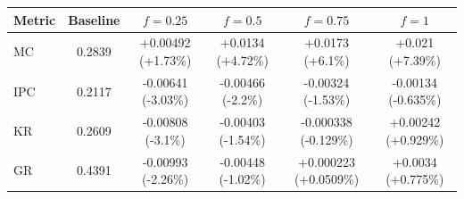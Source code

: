 \begin{tabular}{lccccc}
\toprule
Metric & Baseline & $f=0.25$ & $f=0.5$ & $f=0.75$ & $f=1$ \\
\midrule
MC & 0.2839 & +0.00492 (+1.73\%) & +0.0134 (+4.72\%) & +0.0173 (+6.1\%) & +0.021 (+7.39\%) \\
IPC & 0.2117 & -0.00641 (-3.03\%) & -0.00466 (-2.2\%) & -0.00324 (-1.53\%) & -0.00134 (-0.635\%) \\
KR & 0.2609 & -0.00808 (-3.1\%) & -0.00403 (-1.54\%) & -0.000338 (-0.129\%) & +0.00242 (+0.929\%) \\
GR & 0.4391 & -0.00993 (-2.26\%) & -0.00448 (-1.02\%) & +0.000223 (+0.0509\%) & +0.0034 (+0.775\%) \\
\bottomrule
\end{tabular}
